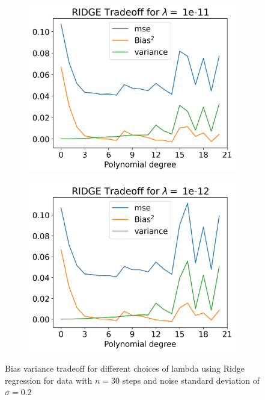 \documentclass[12pt]{article}
\begin{document}
\begin{figure}[H]
  \begin{subfigure}{.5\textwidth}
    \centering
    \includegraphics[width=\textwidth]{../figures/tradeoff_RIDGE_1e-11_20.png}
    \caption{}
    \label{fig:l_1e-11}
  \end{subfigure}
  \begin{subfigure}{.5\textwidth}
    \centering
    \includegraphics[width=\textwidth]{../figures/tradeoff_RIDGE_1e-12_20.png}
    \caption{}
    \label{fig:l_1e-12}
  \end{subfigure}
  \caption{Bias variance tradeoff for different choices of lambda using Ridge regression for data with $n=30$ steps and noise standard deviation of $\sigma=0.2$}
  \label{fig:ridge_tradeoff}
\end{figure}
\end{document}
